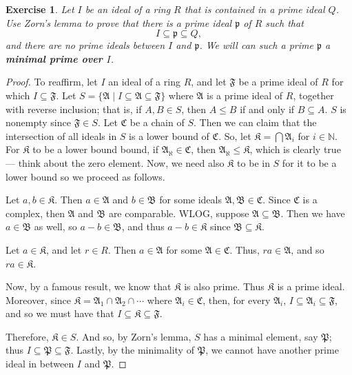 \documentclass[12pt,reqno]{amsart}
\theoremstyle{plain}
\newtheorem{exercise}{Exercise}
\newcommand{\nn}{\mathbb N}
\newcommand{\idealp}{\mathfrak{p}}
\newcommand{\idealP}{\mathfrak{P}}
\newcommand{\idealA}{\mathfrak{A}}
\newcommand{\idealB}{\mathfrak{B}}
\newcommand{\idealF}{\mathfrak{F}}
\newcommand{\ccc}{\mathfrak{C}}
\begin{document}
\begin{exercise} \textup{ Let $I$ be an ideal of a ring $R$ that is contained in a prime ideal $Q$. Use Zorn's lemma to prove that there is a prime ideal $\idealp$ of $R$ such that \[
I \subseteq \idealp \subseteq Q, 
\]
and there are \textit{no} prime ideals between $I$ and $\idealp$. We will can such a prime $\idealp$ a \textbf{minimal prime over $I$}. }
\end{exercise} 
\begin{proof} To reaffirm, let $I$ an ideal of a ring $R$, and let $\idealF$ be a prime  ideal of $R$ for which $I \subseteq \idealF$. Let $S = \{ \idealA \mid I \subseteq \idealA \subseteq \idealF \}$ where $\idealA$ is a prime ideal of $R$, together with reverse inclusion; that is, if $A, B \in S$, then $A \leq B$ if and only if $B \subseteq A$. $S$ is nonempty since $\idealF \in S$. Let $\ccc$ be a chain of $S$. Then we can claim that the intersection of all ideals in $S$ is a lower bound of $\ccc$. So, let $\mathfrak{K} = \bigcap \idealA_i$ for $i \in \nn$. For $\mathfrak{K}$ to be a lower bound bound, if $\idealA_{\aleph} \in \ccc$, then $\idealA _{\aleph} \leq \mathfrak{K}$, which is clearly true — think about the zero element. Now, we need also $\mathfrak{K}$ to be in $S$ for it to be a lower bound so we proceed as follows. 

Let $a, b \in \mathfrak{K}$. Then $a \in \idealA$ and $b \in \idealB$ for some ideals $\idealA, \idealB \in \ccc$. Since $\ccc$ is a complex, then $\idealA$ and $\idealB$ are comparable. WLOG, suppose $\idealA \subseteq \idealB$. Then we have $a \in \idealB$ as well, so $a-b \in \idealB$, and thus $a-b \in \mathfrak{K}$ since $\idealB \subseteq \mathfrak{K}$. 

Let $a \in \mathfrak{K}$, and let $r \in R$. Then $a \in \idealA$ for some $\idealA \in \ccc$. Thus, $ra \in \idealA$, and so $ra \in \mathfrak{K}$.

Now, by a famous result, we know that $ \mathfrak{K}$ is also prime. Thus $ \mathfrak{K}$ is a prime ideal. Moreover, since $ \mathfrak{K} = \idealA_1 \cap \idealA_2 \cap \cdots$ where $\idealA_i \in \ccc$, then, for every $\idealA_i$, $I \subseteq \idealA_i \subseteq \idealF$, and so we must have that $I \subseteq \mathfrak{K} \subseteq \idealF$. 

Therefore, $\mathfrak{K} \in S$. And so, by Zorn's lemma, $S$ has a minimal element, say $\idealP$; thus $I \subseteq \idealP \subseteq \idealF$. Lastly, by the minimality of $\idealP$, we cannot have another prime ideal in between $I$ and $\idealP$. 
\end{proof}
\end{document}
